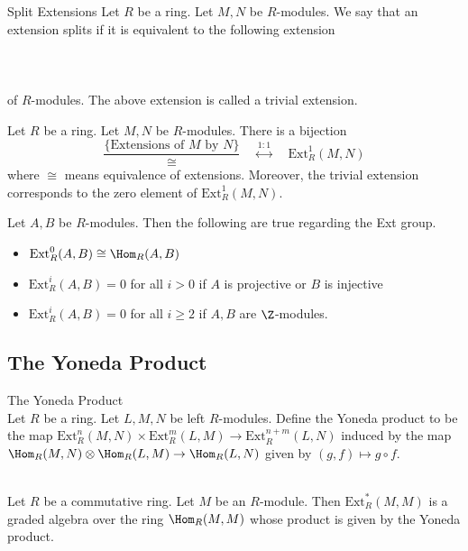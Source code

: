 \documentclass[a4paper]{article}
\begin{document}
\begin{defn}{Split Extensions}{} Let $R$ be a ring. Let $M,N$ be $R$-modules. We say that an extension splits if it is equivalent to the following extension \\~\\
 \\~\\
of $R$-modules. The above extension is called a trivial extension. 
\end{defn}

\begin{prp}{}{} Let $R$ be a ring. Let $M,N$ be $R$-modules. There is a bijection $$\frac{\{\text{Extensions of }M\text{ by }N\}}{\cong}\;\;\;\;\overset{1:1}{\longleftrightarrow}\;\;\;\;\text{Ext}_R^1(M,N)$$ where $\cong$ means equivalence of extensions. Moreover, the trivial extension corresponds to the zero element of $\text{Ext}_R^1(M,N)$. 
\end{prp}

\begin{prp}{}{} Let $A,B$ be $R$-modules. Then the following are true regarding the Ext group. 
\begin{itemize}
\item $\text{Ext}_R^0(A,B)\cong\Hom_R(A,B)$
\item $\text{Ext}_R^i(A,B)=0$ for all $i>0$ if $A$ is projective or $B$ is injective
\item $\text{Ext}_R^i(A,B)=0$ for all $i\geq 2$ if $A,B$ are $\Z$-modules. 
\end{itemize}
\end{prp}

\subsection{The Yoneda Product}
\begin{defn}{The Yoneda Product}{}\\
Let $R$ be a ring. Let $L,M,N$ be left $R$-modules. Define the Yoneda product to be the map $\text{Ext}_R^n(M,N)\times\text{Ext}_R^m(L,M)\to\text{Ext}_R^{n+m}(L,N)$ induced by the map $\Hom_R(M,N)\otimes\Hom_R(L,M)\to\Hom_R(L,N)$ given by $(g,f)\mapsto g\circ f$. 
\end{defn}

\begin{prp}{}{}\\
Let $R$ be a commutative ring. Let $M$ be an $R$-module. Then $\text{Ext}_R^\ast(M,M)$ is a graded algebra over the ring $\Hom_R(M,M)$ whose product is given by the Yoneda product. 
\end{prp}
\end{document}
